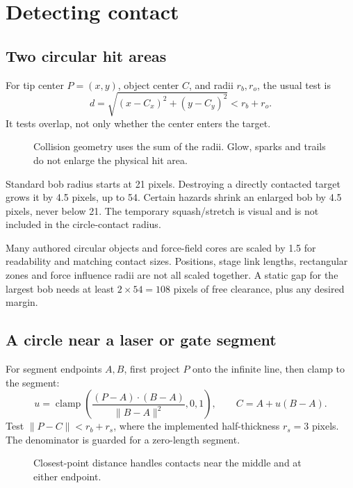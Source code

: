 \documentclass[11pt,a4paper]{article}
\newcommand{\code}[1]{\texttt{\detokenize{#1}}}
\begin{document}
\section{Detecting contact}\label{sec:contacts}
\subsection{Two circular hit areas}
For tip center \(P=(x,y)\), object center \(C\), and radii \(r_b,r_o\), the usual test is
\[
 d=\sqrt{(x-C_x)^2+(y-C_y)^2}<r_b+r_o.
\]
It tests overlap, not only whether the center enters the target.
\begin{figure}[H]\centering
{}\caption{Collision geometry uses the sum of the radii. Glow, sparks and trails do not enlarge the physical hit area.}
\end{figure}
Standard bob radius starts at 21 pixels. Destroying a directly contacted target grows it by 4.5 pixels, up to 54. Certain hazards shrink an enlarged bob by 4.5 pixels, never below 21. The temporary \code{popScale} squash/stretch is visual and is not included in the circle-contact radius.

Many authored circular objects and force-field cores are scaled by 1.5 for readability and matching contact sizes. Positions, stage link lengths, rectangular zones and force influence radii are not all scaled together. A static gap for the largest bob needs at least \(2\times54=108\) pixels of free clearance, plus any desired margin.
\subsection{A circle near a laser or gate segment}
For segment endpoints \(A,B\), first project \(P\) onto the infinite line, then clamp to the segment:
\[
 u=\operatorname{clamp}\!\left(\frac{(P-A)\cdot(B-A)}{\lVert B-A\rVert^2},0,1\right),\qquad C=A+u(B-A).
\]
Test \(\lVert P-C\rVert<r_b+r_s\), where the implemented half-thickness \(r_s=3\) pixels. The denominator is guarded for a zero-length segment.
\begin{figure}[H]\centering
{}\caption{Closest-point distance handles contacts near the middle and at either endpoint.}
\end{figure}
\end{document}
